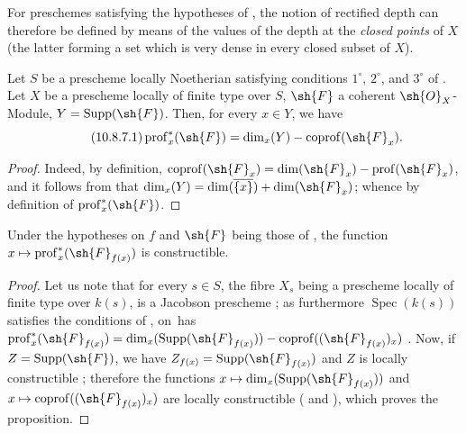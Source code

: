 For preschemes satisfying the hypotheses of , the notion of rectified depth can therefore be defined by means of the values of the depth at the \emph{closed points} of $X$ (the latter forming a set which is very dense in every closed subset of $X$).

\begin{proposition}[10.8.7]
\label{IV.10.8.7}
Let $S$ be a prescheme locally Noetherian satisfying conditions $1^\circ$, $2^\circ$, and $3^\circ$ of .
Let $X$ be a prescheme locally of finite type over $S$, $\sh{F}$ a coherent $\sh{O}_X$-Module, $Y=\operatorname{Supp}(\sh{F})$.
Then, for every $x\in Y$, we have
\begin{equation}
\label{IV.10.8.7.1}
\tag{10.8.7.1}
\operatorname{prof}^*_x(\sh{F})=\dim_x(Y)-\operatorname{coprof}(\sh{F}_x).
\end{equation}
\end{proposition}

\begin{proof}
Indeed, by definition, $\operatorname{coprof}(\sh{F}_x)=\dim(\sh{F}_x)-\operatorname{prof}(\sh{F}_x)$, and it follows from  that $\dim_x(Y)=\dim(\overline{\{x\}})+\dim(\sh{F}_x)$; whence  by definition of $\operatorname{prof}^*_x(\sh{F})$.
\end{proof}

\begin{corollary}[10.8.8]
\label{IV.10.8.8}
Under the hypotheses on $f$ and $\sh{F}$ being those of , the function $x\mapsto\operatorname{prof}^*_x(\sh{F}_{f(x)})$ is constructible.
\end{corollary}

\begin{proof}
Let us note that for every $s\in S$, the fibre $X_s$ being a prescheme locally of finite type over $k(s)$, is a Jacobson prescheme ; as furthermore $\operatorname{Spec}(k(s))$ satisfies the conditions of , on~has $\operatorname{prof}^*_x(\sh{F}_{f(x)})=\dim_x(\operatorname{Supp}(\sh{F}_{f(x)}))-\operatorname{coprof}((\sh{F}_{f(x)})_x)$ .
Now, if $Z=\operatorname{Supp}(\sh{F})$, we have $Z_{f(x)}=\operatorname{Supp}(\sh{F}_{f(x)})$  and $Z$ is locally constructible ; therefore the functions $x\mapsto\dim_x(\operatorname{Supp}(\sh{F}_{f(x)}))$ and $x\mapsto\operatorname{coprof}((\sh{F}_{f(x)})_x)$ are locally constructible ( and ), which proves the proposition.
\end{proof}

